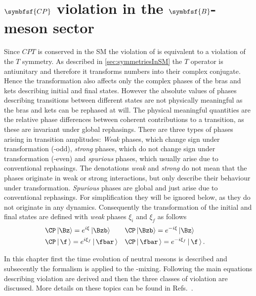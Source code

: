 \chapter[head={\CP violation in the $B$-meson sector},tocentry={$\symbfsf{C{}P}$ violation in the $\symbfsf{B}$-meson sector}]
{$\symbfsf{C{}P}$ violation in the $\symbfsf{B}$-meson sector}
\label{chap:CPV}

Since $CPT$ is conserved in the \ac{SM} the violation of \CP is equivalent to a violation of the $T$ symmetry.
As described in \cref{sec:symmetriesInSM} the $T$ operator is antiunitary and therefore it transforms numbers into their complex conjugate.
Hence the \CP transformation also affects only the complex phases of the bras and kets describing initial and final states.
However the absolute values of phases describing transitions between different states are not physically meaningful as the bras and kets can be rephased at will.
The physical meaningful quantities are the relative phase differences between coherent contributions to a transition, as these are invariant under global rephasings.
There are three types of phases arising in transition amplitudes:
\emph{Weak} phases, which change sign under \CP transformation (\CP-odd), \emph{strong} phases, which do not change sign under \CP transformation (\CP-even) and \emph{spurious} phases, which usually arise due to conventional rephasings.
The denotations \emph{weak} and \emph{strong} do not mean that the phases originate in weak or strong interactions, but only describe their behaviour under \CP transformation.
\emph{Spurious} phases are global and just arise due to conventional rephasings.
For simplification they will be ignored below, as they do not originate in any dynamics.
Consequently the \CP transformation of the initial and final states are defined with \emph{weak} phases $\xi_i$ and $\xi_f$ as follows
\begin{equation}
\begin{aligned}
&\CP\left|\Bz\right> =e^{i\xi}\left|\Bzb\right>&&\CP\left|\Bzb\right>=e^{-i\xi}\left|\Bz\right>&\\
&\CP\left|\,\f\,\right> =e^{i\xi_f}\left|\,\fbar\,\right>&&\CP\left|\,\fbar\,\right>=e^{-i\xi_f}\left|\,\f\,\right>.& \label{eq:CPTransInitFinal}
\end{aligned}
\end{equation}

In this chapter first the time evolution of neutral mesons is described and subsecently the formalism is applied to the \Bz-\Bzb mixing.
Following the main equations describing \CP violation are derived and then the three classes of \CP violation are discussed.
More details on these topics can be found in Refs.~\cite{Branco:396964,Bigi:1295518}.

